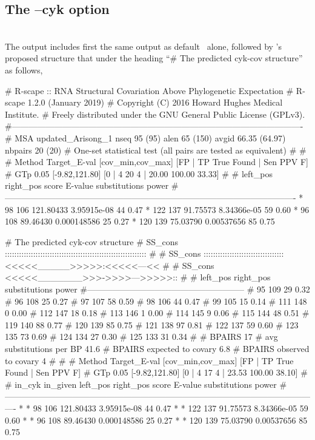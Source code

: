 \subsection{The --cyk option}

\\

\noindent
The output includes first the same output as default \rscape\ alone,
followed by \rscape's proposed structure that under the heading ``\#
The predicted cyk-cov structure'' as follows,

\begin{sreoutput}
# R-scape :: RNA Structural Covariation Above Phylogenetic Expectation
# R-scape 1.2.0 (January 2019)
# Copyright (C) 2016 Howard Hughes Medical Institute.
# Freely distributed under the GNU General Public License (GPLv3).
#-------------------------------------------------------------------------------------------------------
# MSA updated_Arisong_1 nseq 95 (95) alen 65 (150) avgid 66.35 (64.97) nbpairs 20 (20)
# One-set statistical test (all pairs are tested as equivalent) 
#
#
# Method Target_E-val [cov_min,cov_max] [FP | TP True Found | Sen PPV F] 
# GTp    0.05         [-9.82,121.80]     [0 | 4 20 4 | 20.00 100.00 33.33] 
#
#       left_pos       right_pos        score          E-value       substitutions      power
#-------------------------------------------------------------------------------------------------------
*	      98	     106	121.80433	3.95915e-08	44		0.47
*	     122	     137	91.75573	8.34366e-05	59		0.60
*	      96	     108	89.46430	0.000148586	25		0.27
*	     120	     139	75.03790	0.00537656	85		0.75

# The predicted cyk-cov structure
# SS_cons ::::::::::::::::::::::::::::::::::::::::::::::::::::::::::::
#
# SS_cons ::::::::::::::::::::::::::::::::::<<<<<_____>>>>>:<<<<<---<<
#
# SS_cons <<<<<_______>>>->>>>--->>>>>::
#
# left_pos      right_pos    substitutions      power
#--------------------------------------------------------
# 95		109		29		0.32
# 96		108		25		0.27
# 97		107		58		0.59
# 98		106		44		0.47
# 99		105		15		0.14
# 111		148		0		0.00
# 112		147		18		0.18
# 113		146		1		0.00
# 114		145		9		0.06
# 115		144		48		0.51
# 119		140		88		0.77
# 120		139		85		0.75
# 121		138		97		0.81
# 122		137		59		0.60
# 123		135		73		0.69
# 124		134		27		0.30
# 125		133		31		0.34
#
# BPAIRS 17
# avg substitutions per BP  41.6
# BPAIRS expected to covary 6.8
# BPAIRS observed to covary 4
#
#
# Method Target_E-val [cov_min,cov_max] [FP | TP True Found | Sen PPV F] 
# GTp    0.05         [-9.82,121.80]     [0 | 4 17 4 | 23.53 100.00 38.10] 
#
# in_cyk in_given   left_pos       right_pos      score           E-value    substitutions      power
#----------------------------------------------------------------------------------------------------------------
*	*	        98	       106	121.80433	3.95915e-08	44		0.47
*	*	       122	       137	91.75573	8.34366e-05	59		0.60
*	*	        96	       108	89.46430	0.000148586	25		0.27
*	*	       120	       139	75.03790	0.00537656	85		0.75
\end{sreoutput}

